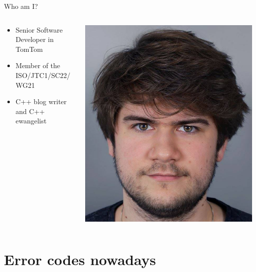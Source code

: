 \documentclass[10pt]{beamer}
\begin{document}
\begin{frame}{Who am I?}
	\begin{columns}[onlytextwidth]
		\begin{column}{0.7\textwidth}
			\begin{itemize}
				\item Senior Software Developer in TomTom
				\item Member of the ISO/JTC1/SC22/WG21
				\item C++ blog writer and C++ ewangelist
			\end{itemize}
		\end{column}
		\begin{column}{0.29\textwidth}
			\includegraphics[width=\linewidth]{Dawid_Pilarski.jpg}
		\end{column}	
	\end{columns}
\end{frame}

\section{Error codes nowadays}
\end{document}
